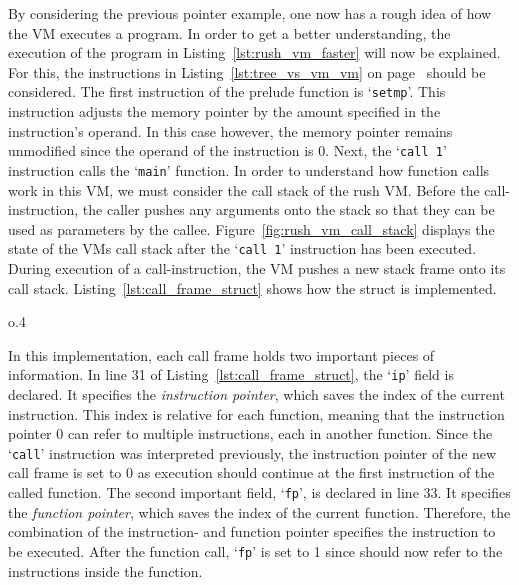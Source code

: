 By considering the previous pointer example, one now has a rough idea of how the VM executes a program.
In order to get a better understanding, the execution of the program in Listing~\ref{lst:rush_vm_faster} will now be explained.
For this, the instructions in Listing~\ref{lst:tree_vs_vm_vm} on page~\pageref{lst:tree_vs_vm_vm} should be considered.
The first instruction of the prelude function is `\texttt{setmp}'.
This instruction adjusts the memory pointer by the amount specified in the instruction's operand.
In this case however, the memory pointer remains unmodified since the operand of the instruction is 0.
Next, the `\texttt{call 1}' instruction calls the `\texttt{main}' function.
In order to understand how function calls work in this VM, we must consider the call stack of the rush VM\@.
Before the call-instruction, the caller pushes any arguments onto the stack so that they can be used as parameters by the callee.
Figure~\ref{fig:rush_vm_call_stack} displays the state of the VMs call stack after the `\texttt{call 1}' instruction has been executed.
During execution of a call-instruction, the VM pushes a new stack frame onto its call stack.
Listing~\ref{lst:call_frame_struct} shows how the  struct is implemented.


\begin{wrapfigure}{o}{.4\textwidth}
	\centering
	\caption{Example call stack of the rush VM.}\label{fig:rush_vm_call_stack}
\end{wrapfigure}

In this implementation, each call frame holds two important pieces of information.
In line 31 of Listing~\ref{lst:call_frame_struct}, the `\texttt{ip}' field is declared.
It specifies the \emph{instruction pointer}, which saves the index of the current instruction.
This index is relative for each function, meaning that the instruction pointer 0 can refer to multiple instructions,
each in another function.
Since the `\texttt{call}' instruction was interpreted previously, the instruction pointer of the new call frame is set to 0 as execution should continue at the first instruction of the called function.
The second important field, `\texttt{fp}', is declared in line 33.
It specifies the \emph{function pointer}, which saves the index of the current function.
Therefore, the combination of the instruction- and function pointer specifies the instruction to be executed.
After the function call, `\texttt{fp}' is set to 1 since  should now refer to the instructions inside the  function.

